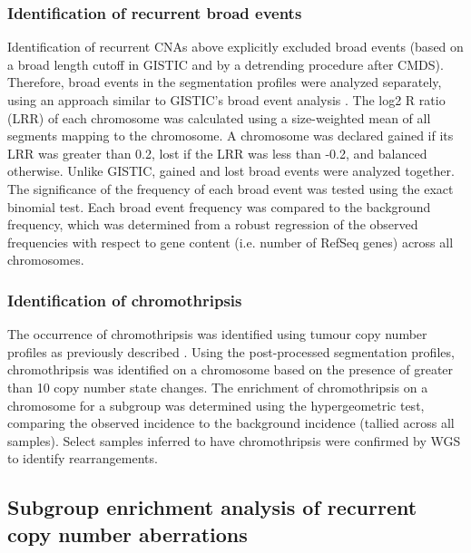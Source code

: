 \subsubsection{Identification of recurrent broad events}

Identification of recurrent CNAs above explicitly excluded broad events (based on a broad length cutoff in GISTIC and by a detrending procedure after CMDS). Therefore, broad events in the segmentation profiles were analyzed separately, using an approach similar to GISTIC’s broad event analysis . The log2 R ratio (LRR) of each chromosome was calculated using a size-weighted mean of all segments mapping to the chromosome. A chromosome was declared gained if its LRR was greater than 0.2, lost if the LRR was less than -0.2, and balanced otherwise. Unlike GISTIC, gained and lost broad events were analyzed together. The significance of the frequency of each broad event was tested using the exact binomial test. Each broad event frequency was compared to the background frequency, which was determined from a robust regression of the observed frequencies with respect to gene content (i.e. number of RefSeq genes) across all chromosomes.

\subsubsection{Identification of chromothripsis}

The occurrence of chromothripsis was identified using tumour copy number profiles as previously described . Using the post-processed segmentation profiles, chromothripsis was identified on a chromosome based on the presence of greater than 10 copy number state changes. The enrichment of chromothripsis on a chromosome for a subgroup was determined using the hypergeometric test, comparing the observed incidence to the background incidence (tallied across all samples). Select samples inferred to have chromothripsis were confirmed by WGS to identify rearrangements.

\subsection{Subgroup enrichment analysis of recurrent copy number aberrations}

